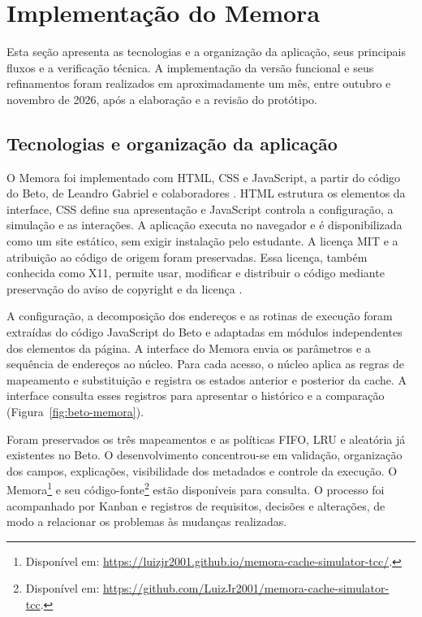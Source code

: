 \section{Implementação do Memora}
\label{sec:implementacao-memora}

Esta seção apresenta as tecnologias e a organização da aplicação, seus principais fluxos e a verificação técnica. A implementação da versão funcional e seus refinamentos foram realizados em aproximadamente um mês, entre outubro e novembro de 2026, após a elaboração e a revisão do protótipo.

\subsection{Tecnologias e organização da aplicação}

O Memora foi implementado com HTML, CSS e JavaScript, a partir do código do Beto, de Leandro Gabriel e colaboradores \cite{gabriel2022beto}. HTML estrutura os elementos da interface, CSS define sua apresentação e JavaScript controla a configuração, a simulação e as interações. A aplicação executa no navegador e é disponibilizada como um site estático, sem exigir instalação pelo estudante. A licença MIT e a atribuição ao código de origem foram preservadas. Essa licença, também conhecida como X11, permite usar, modificar e distribuir o código mediante preservação do aviso de copyright e da licença \cite{mitlicense}.

A configuração, a decomposição dos endereços e as rotinas de execução foram extraídas do código JavaScript do Beto e adaptadas em módulos independentes dos elementos da página. A interface do Memora envia os parâmetros e a sequência de endereços ao núcleo. Para cada acesso, o núcleo aplica as regras de mapeamento e substituição e registra os estados anterior e posterior da cache. A interface consulta esses registros para apresentar o histórico e a comparação (Figura~\ref{fig:beto-memora}).

Foram preservados os três mapeamentos e as políticas FIFO, LRU e aleatória já existentes no Beto. O desenvolvimento concentrou-se em validação, organização dos campos, explicações, visibilidade dos metadados e controle da execução. O Memora\footnote{Disponível em: \url{https://luizjr2001.github.io/memora-cache-simulator-tcc/}.} e seu código-fonte\footnote{Disponível em: \url{https://github.com/LuizJr2001/memora-cache-simulator-tcc}.} estão disponíveis para consulta. O processo foi acompanhado por Kanban e registros de requisitos, decisões e alterações, de modo a relacionar os problemas às mudanças realizadas.


